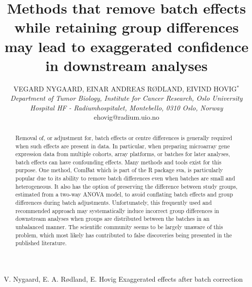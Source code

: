 \documentclass{bio}
\begin{document}
\title{Methods that remove batch effects while retaining group differences may lead
to exaggerated confidence in downstream analyses
}

\author{VEGARD NYGAARD, EINAR ANDREAS RØDLAND, EIVIND HOVIG$^\ast$\\[4pt]
\textit{Department of Tumor Biology,
Institute for Cancer Research,
Oslo University Hospital HF - Radiumhospitalet,
Montebello,
0310 Oslo,
Norway}
\\[2pt]
{ehovig@radium.uio.no}}

\markboth%
{V. Nygaard, E. A. Rødland, E. Hovig}
{Exaggerated effects after batch correction}


\maketitle


\begin{abstract}
{Removal of, or adjustment for, batch effects or centre differences is generally required when such effects are present in data. In particular, when preparing microarray gene expression data from multiple cohorts, array platforms, or batches for later analyses, batch effects can have confounding effects. Many methods and tools exist for this purpose. One method, ComBat which is part of the R package sva, is particularly popular due to its ability to remove batch differences even when batches are small and heterogeneous. It also has the option of preserving the difference between study groups, estimated from a two-way ANOVA model, to avoid conflating batch effects and group differences during batch adjustments. Unfortunately, this frequently used and recommended approach may systematically induce incorrect group differences in downstream analyses when groups are distributed between the batches in an unbalanced manner. The scientific community seems to be largely unaware of this problem, which most likely has contributed to false discoveries being presented in the published literature.
}
\end{abstract}
\end{document}
